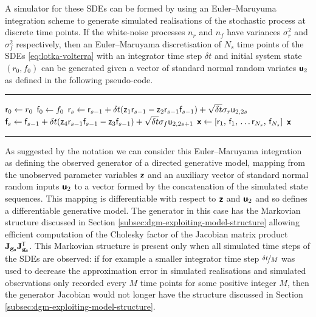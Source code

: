 A simulator for these \acp{SDE} can be formed by using an Euler--Maruyuma \citep{kloeden1992numerical} integration scheme to generate simulated realisations of the sto\-chastic process at discrete time points. If the white-noise processes $n_r$ and $n_f$ have variances $\sigma_r^2$ and $\sigma_f^2$ respectively, then an Euler--Maruyama discretisation of $N_s$ time points of the \acp{SDE} \ref{eq:lotka-volterra} with an integrator time step $\delta t$ and initial system state $(r_0,f_0)$ can be generated given a vector of standard normal random variates $\boldsymbol{\mathsf{u}}_2$ as defined in the following pseudo-code.
\vspace{3mm}
\hrule
\begin{algorithmic}
\small
{}
  \State $\mathsf{r}_0 \gets r_0$  
  \State $\mathsf{f}_0 \gets f_0$
    \State $\mathsf{r}_s \gets \mathsf{r}_{s-1} + \delta t(\mathsf{z}_1 \mathsf{r}_{s-1} - \mathsf{z}_2 \mathsf{r}_{s-1} \mathsf{f}_{s-1}) + \sqrt{\delta t} \sigma_r  \mathsf{u}_{2,2s}$
    \State $\mathsf{f}_s \gets \mathsf{f}_{s-1} + \delta t(\mathsf{z}_4 \mathsf{r}_{s-1} \mathsf{f}_{s-1} - \mathsf{z}_3 \mathsf{f}_{s-1}) + \sqrt{\delta t} \sigma_f  \mathsf{u}_{2,2s+1}$
  \EndFor
  \State $\rvct{x} \gets \lsb \rvar{r}_1,\, \rvar{f}_1, \,\dots \rvar{r}_{N_s},\,\rvar{f}_{N_s} \rsb$
  \State \Return $\boldsymbol{\mathsf{x}}$
\EndFunction
\end{algorithmic}
\vspace{0mm}
\hrule
\vspace{1mm}
As suggested by the notation we can consider this Euler--Maruyama integration as defining the observed generator of a directed generative model, mapping from the unobserved parameter variables $\boldsymbol{\mathsf{z}}$ and an auxiliary vector of standard normal random inputs $\boldsymbol{\mathsf{u}}_2$ to a vector formed by the concatenation of the simulated state sequences. This mapping is differentiable with respect to $\boldsymbol{\mathsf{z}}$ and $\boldsymbol{\mathsf{u}}_2$ and so defines a differentiable generative model. The generator in this case has the Markovian structure discussed in Section \ref{subsec:dgm-exploiting-model-structure} allowing efficient computation of the Cholesky factor of the Jacobian matrix product $\mathbf{J}_{{\mathbf{g}}_{\boldsymbol{\mathsf{x}}}}\mathbf{J}_{{\mathbf{g}}_{\boldsymbol{\mathsf{x}}}}^{\mkern-1.5mu\mathsf{T}}$. This Markovian structure is present only when all simulated time steps of the \acp{SDE} are observed: if for example a smaller integrator time step $\nicefrac{\delta t}{M}$ was used to decrease the approximation error in simulated realisations and simulated observations only recorded every $M$ time points for some positive integer $M$, then the generator Jacobian would not longer have the structure discussed in Section \ref{subsec:dgm-exploiting-model-structure}.

